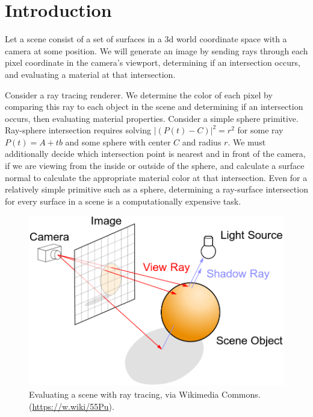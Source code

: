 \documentclass[sigconf, nonacm]{acmart}
\begin{document}
\maketitle

\section{Introduction}

Let a scene consist of a set of surfaces in a 3d world coordinate space with a camera at some position. We will generate an image by sending rays through each pixel coordinate in the camera's viewport, determining if an intersection occurs, and evaluating a material at that intersection.

Consider a ray tracing renderer. We determine the color of each pixel by comparing this ray to each object in the scene and determining if an intersection occurs, then evaluating material properties. Consider a simple sphere primitive. Ray-sphere intersection requires solving $|(P(t)-C)|^2 = r^2$ for some ray $P(t) = A + tb$ and some sphere with center $C$ and radius $r$. We must additionally decide which intersection point is nearest and in front of the camera, if we are viewing from the inside or outside of the sphere, and calculate a surface normal to calculate the appropriate material color at that intersection. Even for a relatively simple primitive such as a sphere, determining a ray-surface intersection for every surface in a scene is a computationally expensive task.

\begin{figure}[h]
  \centering
  \includegraphics[width=0.6\linewidth]{images/Ray_trace_diagram.png}
  \caption{Evaluating a scene with ray tracing, via Wikimedia
    Commons. (\url{https://w.wiki/55Pu}).}
\end{figure}
\end{document}
